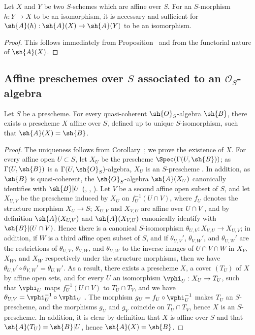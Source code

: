 \begin{corollary}[1.2.8]
\label{II.1.2.8}
Let $X$ and $Y$ be two $S$-schemes which are affine over $S$.
For an $S$-morphism $h:Y\to X$ to be an isomorphism, it is necessary and sufficient for $\sh{A}(h):\sh{A}(X)\to\sh{A}(Y)$ to be an isomorphism.
\end{corollary}

\begin{proof}
This follows immediately from Proposition~ and from the functorial nature of $\sh{A}(X)$.
\end{proof}

\subsection{Affine preschemes over $S$ associated to an $\mathcal{O}_S$-algebra}
\label{subsection:II.1.3}
\label{II.1.3}

\begin{proposition}[1.3.1]
\label{II.1.3.1}
Let $S$ be a prescheme.
For every quasi-coherent $\sh{O}_S$-algebra $\sh{B}$, there exists a prescheme $X$ affine over $S$, defined up to unique $S$-isomorphism, such that $\sh{A}(X)=\sh{B}$.
\end{proposition}

\begin{proof}
The uniqueness follows from Corollary~; we prove the existence of $X$.
For every affine open $U\subset S$, let $X_U$ be the prescheme $\Spec(\Gamma(U,\sh{B}))$; as $\Gamma(U,\sh{B})$ is a $\Gamma(U,\sh{O}_S)$-algebra, $X_U$ is an $S$-prescheme .
In addition, as $\sh{B}$ is quasi-coherent, the $\sh{O}_S$-algebra $\sh{A}(X_U)$ canonically identifies with $\sh{B}|U$ (, , ).
Let $V$ be a second affine open subset of $S$, and let $X_{U,V}$ be the prescheme induced by $X_U$ on $f_U^{-1}(U\cap V)$, where $f_U$ denotes the structure morphism $X_U\to S$; $X_{U,V}$ and $X_{V,U}$ are affine over $U\cap V$ , and by definition $\sh{A}(X_{U,V})$ and $\sh{A}(X_{V,U})$ canonically identify with $\sh{B}|(U\cap V)$.
Hence there is  a canonical $S$-isomorphism $\theta_{U,V}:X_{V,U}\to X_{U,V}$; in addition, if $W$ is a third affine open subset of $S$, and if $\theta_{U,V}'$, $\theta_{V,W}'$, and $\theta_{U,W}'$ are the restrictions of $\theta_{U,V}$, $\theta_{V,W}$, and $\theta_{U,W}$ to the inverse images of $U\cap V\cap W$ in $X_V$, $X_W$, and $X_W$ respectively under the structure morphisms, then we have $\theta_{U,V}'\circ\theta_{V,W}'=\theta_{U,W}'$.
As a result, there exists a prescheme $X$, a cover $(T_U)$ of $X$ by affine open sets, and for every $U$ an isomorphism $\vphi_U:X_U\to T_U$, such that $\vphi_U$ maps $f_U^{-1}(U\cap V)$ to $T_U\cap T_V$, and we have $\theta_{U,V}=\vphi_U^{-1}\circ\vphi_V$ .
The morphism $g_U=f_U\circ\vphi_U^{-1}$ makes $T_U$ an $S$-prescheme, and the morphisms $g_U$ and $g_V$ coincide on $T_U\cap T_V$, hence $X$ is an $S$-prescheme.
In addition, it is clear by definition that $X$ is affine over $S$ and that $\sh{A}(T_U)=\sh{B}|U$, hence $\sh{A}(X)=\sh{B}$.
\end{proof}

